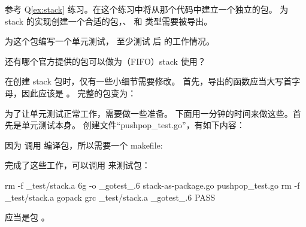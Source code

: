 \begin{Exercise}[title={stack 包},difficulty=2]
\label{ex:stack-package}
\Question\label{ex:stack-package q1} 
参考 Q\ref{ex:stack} 练习。在这个练习中将从那个代码中建立一个独立的包。
为 stack 的实现创建一个合适的包，、 和  类型需要被导出。

\Question\label{ex:stack-package q2} 为这个包编写一个单元测试，
至少测试  后  的工作情况。

\Question\label{ex:stack-package q3} 还有哪个官方提供的包可以做为（FIFO）stack 使用？
\end{Exercise}

\begin{Answer}
\Question 在创建 stack 包时，仅有一些小细节需要修改。
首先，导出的函数应当大写首字母，因此应该是 。
完整的包变为：


\Question 为了让单元测试正常工作，需要做一些准备。
下面用一分钟的时间来做这些。首先是单元测试本身。
创建文件“pushpop\_test.go”，有如下内容：

因为  调用  编译包，所以需要一个 makefile:

完成了这些工作，可以调用  来测试包：
\begin{display}
\pr {}
rm -f _test/stack.a
6g  -o _gotest_.6 stack-as-package.go  pushpop_test.go
rm -f _test/stack.a
gopack grc _test/stack.a _gotest_.6 
PASS
\end{display}

\Question 应当是包 。

\end{Answer}
